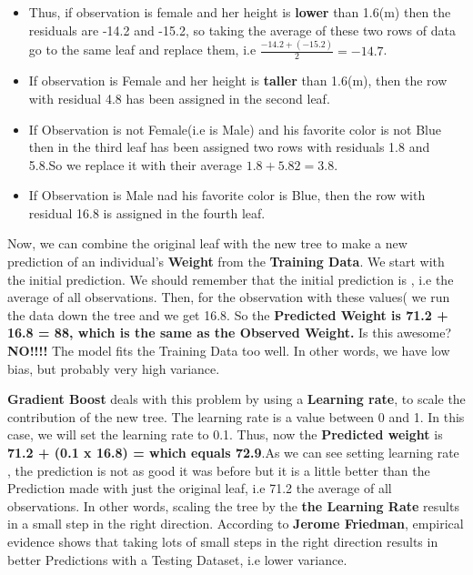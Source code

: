 \documentclass[12pt, a4paper]{article} %
\begin{document}
\begin{itemize}

\item Thus, if observation is female and her height is \textbf{lower} than 1.6(m) then the residuals are -14.2 and -15.2, so taking the average of these two rows of data go to the same leaf and replace them, i.e $\frac{-14.2 + (-15.2)}{2} = -14.7$.

\item If observation is Female and her height is \textbf{taller} than 1.6(m), then the row with residual 4.8 has been assigned in the second leaf.

\item If Observation is not Female(i.e is Male) and his favorite color is not Blue then in the third leaf has been assigned two rows with residuals 1.8 and 5.8.So we replace it with their average ${1.8 + 5.8}{2} = 3.8$.

\item If Observation is Male nad his favorite color is Blue, then the row with residual 16.8 is assigned in the fourth leaf.

\end{itemize}


Now, we can combine the original leaf with the new tree to make a new prediction of an individual's \textbf{Weight} from the \textbf{Training Data}.
We start with the initial prediction. We should remember that the initial prediction is , i.e the average of all observations. Then, for the observation with these values( we run the data down the tree and we get 16.8. So the \textbf{Predicted Weight is 71.2 + 16.8 = 88, which is the same as the Observed Weight.} Is this awesome? \textbf{NO!!!!} The model fits the Training Data too well. In other words, we have low bias, but probably very high variance.

\newline

\textbf{Gradient Boost} deals with this problem by using a \textbf{Learning rate}, to scale the contribution of the new tree. The learning rate is a value between 0 and 1. In this case, we will set the learning rate to 0.1. Thus, now the \textbf{Predicted weight} is \textbf{71.2 + (0.1 x 16.8) = which equals 72.9}.As we can see setting learning rate , the prediction is not as good it was before but it is a little better than the Prediction made with just the original leaf, i.e 71.2 the average of all observations. In other words, scaling the tree by the \textbf{the Learning Rate} results in a small step in the right direction. According to \textbf{Jerome Friedman}, empirical evidence shows that taking lots of small steps in the right direction results in better Predictions with a Testing Dataset, i.e lower variance.
\end{document}

